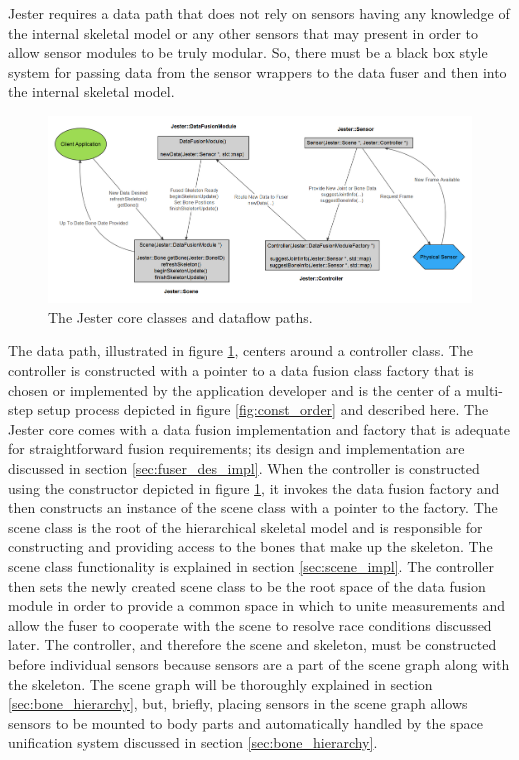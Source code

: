 Jester requires a data path that does not rely on sensors having any knowledge of the internal skeletal model or any other sensors that may present in order to allow sensor modules to be truly modular. So, there must be a black box style system for passing data from the sensor wrappers to the data fuser and then into the internal skeletal model. 

\begin{figure}[]
\centering
\includegraphics[width=1\textwidth]{figures/mainDataFlow}
\caption{The Jester core classes and dataflow paths.}
\label{fig:broad_datapath}
\end{figure}

The data path, illustrated in figure \ref{fig:broad_datapath}, centers around a controller class. The controller is constructed with a pointer to a data fusion class factory that is chosen or implemented by the application developer and is the center of a multi-step setup process depicted in figure \ref{fig:const_order} and described here. The Jester core comes with a data fusion implementation and factory that is adequate for straightforward fusion requirements; its design and implementation are discussed in section \ref{sec:fuser_des_impl}. When the controller is constructed using the constructor depicted in figure \ref{fig:broad_datapath}, it invokes the data fusion factory and then constructs an instance of the scene class with a pointer to the factory. The scene class is the root of the hierarchical skeletal model and is responsible for constructing and providing access to the bones that make up the skeleton. The scene class functionality is explained in section \ref{sec:scene_impl}. The controller then sets the newly created scene class to be the root space of the data fusion module in order to provide a common space in which to unite measurements and allow the fuser to cooperate with the scene to resolve race conditions discussed later. The controller, and therefore the scene and skeleton, must be constructed before individual sensors because sensors are a part of the scene graph along with the skeleton. The scene graph will be thoroughly explained in section \ref{sec:bone_hierarchy}, but, briefly, placing sensors in the scene graph allows sensors to be mounted to body parts and automatically handled by the space unification system discussed in section \ref{sec:bone_hierarchy}. 

